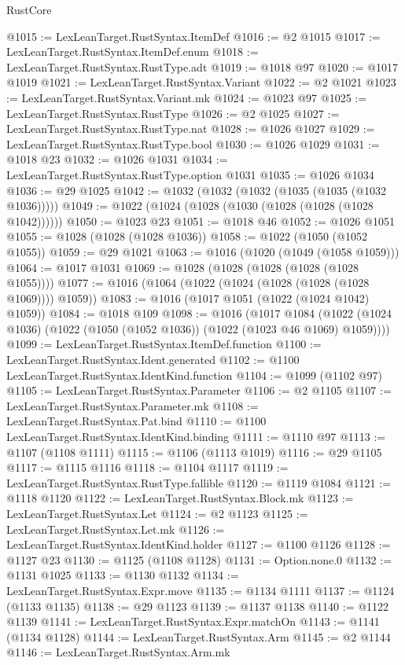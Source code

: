 \begin{lexlean}{RustCore}
\begin{coremodule}
@1015 := LexLeanTarget.RustSyntax.ItemDef
@1016 := @2 @1015
@1017 := LexLeanTarget.RustSyntax.ItemDef.enum
@1018 := LexLeanTarget.RustSyntax.RustType.adt
@1019 := @1018 @97
@1020 := @1017 @1019
@1021 := LexLeanTarget.RustSyntax.Variant
@1022 := @2 @1021
@1023 := LexLeanTarget.RustSyntax.Variant.mk
@1024 := @1023 @97
@1025 := LexLeanTarget.RustSyntax.RustType
@1026 := @2 @1025
@1027 := LexLeanTarget.RustSyntax.RustType.nat
@1028 := @1026 @1027
@1029 := LexLeanTarget.RustSyntax.RustType.bool
@1030 := @1026 @1029
@1031 := @1018 @23
@1032 := @1026 @1031
@1034 := LexLeanTarget.RustSyntax.RustType.option @1031
@1035 := @1026 @1034
@1036 := @29 @1025
@1042 := @1032 (@1032 (@1032 (@1035 (@1035 (@1032 @1036)))))
@1049 := @1022 (@1024 (@1028 (@1030 (@1028 (@1028 (@1028 @1042))))))
@1050 := @1023 @23
@1051 := @1018 @46
@1052 := @1026 @1051
@1055 := @1028 (@1028 (@1028 @1036))
@1058 := @1022 (@1050 (@1052 @1055))
@1059 := @29 @1021
@1063 := @1016 (@1020 (@1049 (@1058 @1059)))
@1064 := @1017 @1031
@1069 := @1028 (@1028 (@1028 (@1028 (@1028 @1055))))
@1077 := @1016 (@1064 (@1022 (@1024 (@1028 (@1028 (@1028 @1069)))) @1059))
@1083 := @1016 (@1017 @1051 (@1022 (@1024 @1042) @1059))
@1084 := @1018 @109
@1098 := @1016
    (@1017
      @1084
      (@1022 (@1024 @1036) (@1022 (@1050 (@1052 @1036)) (@1022 (@1023 @46 @1069) @1059))))
@1099 := LexLeanTarget.RustSyntax.ItemDef.function
@1100 := LexLeanTarget.RustSyntax.Ident.generated
@1102 := @1100 LexLeanTarget.RustSyntax.IdentKind.function
@1104 := @1099 (@1102 @97)
@1105 := LexLeanTarget.RustSyntax.Parameter
@1106 := @2 @1105
@1107 := LexLeanTarget.RustSyntax.Parameter.mk
@1108 := LexLeanTarget.RustSyntax.Pat.bind
@1110 := @1100 LexLeanTarget.RustSyntax.IdentKind.binding
@1111 := @1110 @97
@1113 := @1107 (@1108 @1111)
@1115 := @1106 (@1113 @1019)
@1116 := @29 @1105
@1117 := @1115 @1116
@1118 := @1104 @1117
@1119 := LexLeanTarget.RustSyntax.RustType.fallible
@1120 := @1119 @1084
@1121 := @1118 @1120
@1122 := LexLeanTarget.RustSyntax.Block.mk
@1123 := LexLeanTarget.RustSyntax.Let
@1124 := @2 @1123
@1125 := LexLeanTarget.RustSyntax.Let.mk
@1126 := LexLeanTarget.RustSyntax.IdentKind.holder
@1127 := @1100 @1126
@1128 := @1127 @23
@1130 := @1125 (@1108 @1128)
@1131 := Option.none.{0}
@1132 := @1131 @1025
@1133 := @1130 @1132
@1134 := LexLeanTarget.RustSyntax.Expr.move
@1135 := @1134 @1111
@1137 := @1124 (@1133 @1135)
@1138 := @29 @1123
@1139 := @1137 @1138
@1140 := @1122 @1139
@1141 := LexLeanTarget.RustSyntax.Expr.matchOn
@1143 := @1141 (@1134 @1128)
@1144 := LexLeanTarget.RustSyntax.Arm
@1145 := @2 @1144
@1146 := LexLeanTarget.RustSyntax.Arm.mk

\end{coremodule}
\end{lexlean}

